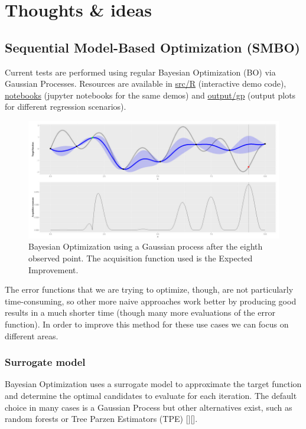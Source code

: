 
\chapter{Thoughts \& ideas} %

\label{sec:ideas} %

\section{Sequential Model-Based Optimization (SMBO)}
Current tests are performed using regular Bayesian Optimization (BO) via Gaussian Processes. Resources are available in \url{src/R} (interactive demo code), \url{notebooks} (jupyter notebooks for the same demos) and \url{output/gp} (output plots for different regression scenarios).

\begin{figure}[h]
	\centering
	\includegraphics[width=\textwidth]{figures/bo_gp_regression}
	\decoRule
	\caption[Bayesian Optimization]{Bayesian Optimization using a Gaussian process after the eighth observed point. The acquisition function used is the Expected Improvement.}
	\label{fig:bo_gp_regression}
\end{figure}

The error functions that we are trying to optimize, though, are not particularly time-consuming, so other more naive approaches work better by producing good results in a much shorter time (though many more evaluations of the error function). In order to improve this method for these use cases we can focus on different areas.

\subsection{Surrogate model}
Bayesian Optimization uses a surrogate model to approximate the target function and determine the optimal candidates to evaluate for each iteration. The default choice in many cases is a Gaussian Process but other alternatives exist, such as random forests or Tree Parzen Estimators (TPE) [\cite{rasmussen_gaussian_2006}][\cite{bergstra_algorithms_2011}].

